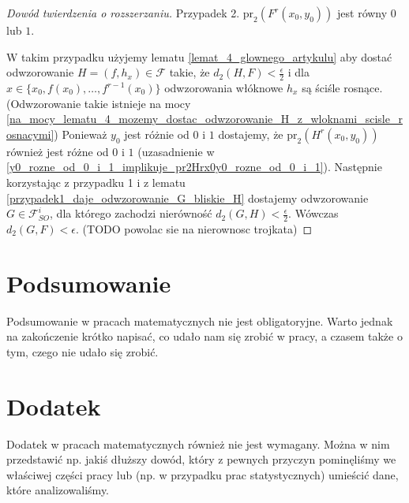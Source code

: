 \documentclass[licencjacka]{pwr_wmat_praca_dyplomowa}
\theoremstyle{plain}
\numberwithin{theorem}{chapter}
\theoremstyle{definition}
\numberwithin{theorem}{chapter}
\begin{document}
\begin{proof}[Dowód twierdzenia o rozszerzaniu]
Przypadek 2. $\textrm{pr}_2(F^r(x_0, y_0))$ jest równy $0$ lub $1$.

W takim przypadku użyjemy lematu \ref{lemat_4_glownego_artykulu} aby dostać odwzorowanie $H = (f, h_x) \in \mathcal{F}$ takie, że $d_2(H, F) < \frac{\epsilon}{2}$ i dla $x \in \{x_0, f(x_0), \ldots, f^{r-1}(x_0)\}$ odwzorowania włóknowe $h_x$ są ściśle rosnące. (Odwzorowanie takie istnieje na mocy \ref{na_mocy_lematu_4_mozemy_dostac_odwzorowanie_H_z_wloknami_scisle_rosnacymi}) Ponieważ $y_0$ jest różnie od $0$ i $1$ dostajemy, że $\textrm{pr}_2(H^r(x_0, y_0))$ również jest różne od $0$ i $1$ (uzasadnienie w \ref{y0_rozne_od_0_i_1_implikuje_pr2Hrx0y0_rozne_od_0_i_1}). Następnie korzystając z przypadku 1 i z lematu \ref{przypadek1_daje_odwzorowanie_G_bliskie_H} dostajemy odwzorowanie $G \in \mathcal{F}_{SO}^i$, dla którego zachodzi nierówność $d_2(G, H) < \frac{\epsilon}{2}$. Wówczas $d_2(G, F) < \epsilon$. (TODO powolac sie na nierownosc trojkata)


\end{proof}







{\backmatter \chapter{Podsumowanie}}
Podsumowanie w pracach matematycznych nie jest obligatoryjne. Warto jednak na zakończenie krótko napisać, co udało nam się zrobić w pracy, a czasem także o tym, czego nie udało się zrobić.

{\backmatter \chapter{Dodatek}}
Dodatek w pracach matematycznych również nie jest wymagany. Można w nim przedstawić np. jakiś dłuższy dowód, który z pewnych przyczyn pominęliśmy we właściwej części pracy lub (np. w przypadku prac statystycznych) umieścić dane, które analizowaliśmy.

\newpage
\end{document}
